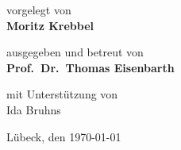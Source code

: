 \begin{titlepage}
{%
vorgelegt von \\ %
\textbf{Moritz Krebbel}

\vspace*{1.5em}

ausgegeben und betreut von \\ %
\textbf{Prof.\ Dr.\ Thomas Eisenbarth}

\vspace*{1.5em}

mit Unterstützung von \\ %
Ida Bruhns

\vspace*{2em}

\vfill

Lübeck, den \today
}
\end{titlepage}
